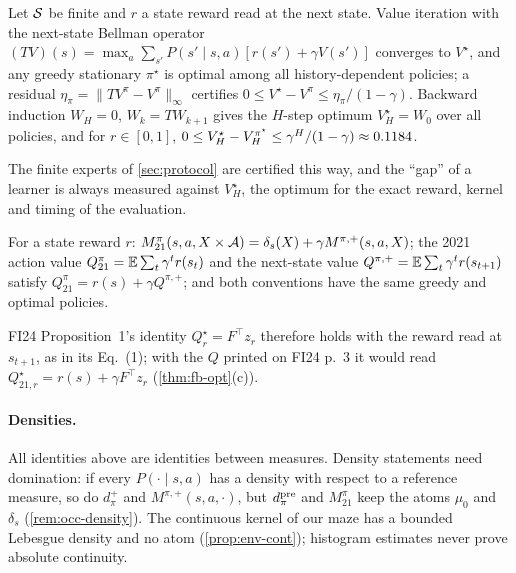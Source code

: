 \begin{proposition}\label{prop:m-oracle}
Let $\cS$ be finite and $r$ a state reward read at the next state. Value iteration with the next-state Bellman operator $(TV)(s)=\max_a\sum_{s'}P(s'\mid s,a)[r(s')+\gamma V(s')]$ converges to $V^\star$, and any greedy stationary $\pi^\star$ is optimal among all history-dependent policies; a residual $\eta_\pi=\lVert TV^\pi-V^\pi\rVert_\infty$ certifies $0\le V^\star-V^\pi\le\eta_\pi/(1-\gamma)$.
Backward induction $W_H=0$, $W_k=TW_{k+1}$ gives the $H$-step optimum $V^\star_H=W_0$ over all policies, and for $r\in[0,1]$, $0\le V^\star_H-V^{\pi^\star}_H\le\gamma^H/(1-\gamma)\approx\vn{const.gH_over4}{0.1184}$.
\end{proposition}

The finite experts of \cref{sec:protocol} are certified this way, and the ``gap'' of a learner is always measured against $V^\star_H$, the optimum for the exact reward, kernel and timing of the evaluation.

\begin{proposition}\label{prop:m-conv}
For a state reward $r$: $M^\pi_{21}(s,a,X\times\cA)=\delta_s(X)+\gamma M^{\pi,+}(s,a,X)$; the 2021 action value $Q^\pi_{21}=\E\sum_t\gamma^tr(s_t)$ and the next-state value $Q^{\pi,+}=\E\sum_t\gamma^tr(s_{t+1})$ satisfy $Q^\pi_{21}=r(s)+\gamma Q^{\pi,+}$; and both conventions have the same greedy and optimal policies.
\end{proposition}

FI24 Proposition~1's identity $Q^\star_r=F^\top z_r$ therefore holds with the reward read at $s_{t+1}$, as in its Eq.~(1); with the $Q$ printed on FI24 p.~3 it would read $Q^\star_{21,r}=r(s)+\gamma F^\top z_r$ (\cref{thm:fb-opt}(c)).

\paragraph{Densities.} All identities above are identities between measures.
Density statements need domination: if every $P(\cdot\mid s,a)$ has a density with respect to a reference measure, so do $d^+_\pi$ and $M^{\pi,+}(s,a,\cdot)$, but $d^{\pre}_\pi$ and $M^\pi_{21}$ keep the atoms $\mu_0$ and $\delta_s$ (\cref{rem:occ-density}). The continuous kernel of our maze has a bounded Lebesgue density and no atom (\cref{prop:env-cont}); histogram estimates never prove absolute continuity.
